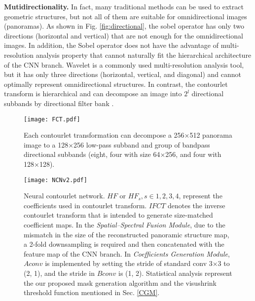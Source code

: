 \documentclass[10pt,times,mathptm,psfig,twocolumn,journals]{IEEEtran}
\begin{document}
\textbf{Mutidirectionality.}
In fact, many traditional methods can be used to extract geometric structures, but not all of them are suitable for omnidirectional images (panoramas). As shown in Fig. \ref{fig:directional}, the sobel operator has only two directions (horizontal and vertical) that are not enough for the omnidirectional images. In addition, the Sobel operator does not have the advantage of multi-resolution analysis property that cannot naturally fit the hierarchical architecture of the CNN branch. Wavelet is a commonly used multi-resolution analysis tool, but it has only three directions (horizontal, vertical, and diagonal) and cannot optimally represent omnidirectional structures. In contrast, the contourlet transform is hierarchical and can decompose an image into $2^{l}$ directional subbands by directional filter bank \cite{MengkunLiu2021CCNNCC}.
\begin{figure}[t]
\centering
\texttt{[image: FCT.pdf]}
\caption{Each contourlet transformation can decompose a 256×512 panorama image to a 128×256 low-pass subband and group of bandpass directional subbands (eight, four with size 64×256, and four with 128×128).}
\label{fig:FCT}
\end{figure}
\begin{figure*}[t]
\centering
\texttt{[image: NCNv2.pdf]}
\caption{Neural contourlet network. $HF$ or $HF_{s}, s\in {1, 2, 3, 4}$, represent the coefficients used in contourlet transform. $IFCT$ denotes the inverse contourlet transform that is intended to generate size-matched coefficient maps. In the \textit{Spatial–Spectral Fusion Module}, due to the mismatch in the size of the reconstructed panoramic structure map, a 2-fold downsampling is required and then concatenated with the feature map of the CNN branch. In \textit{Coefficients Generation Module}, $Aconv$ is implemented by setting the stride of standard conv 3×3 to (2, 1), and the stride in $Bconv$ is (1, 2). Statistical analysis represent the our proposed mask generation algorithm and the visushrink threshold function mentioned in Sec. \ref{CGM}.}
\label{fig:net}
\end{figure*}
\end{document}

